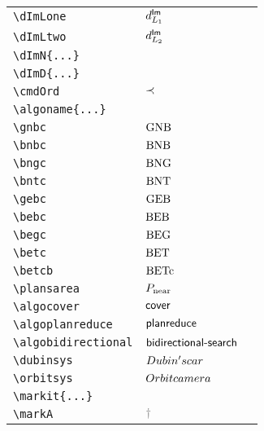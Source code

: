 \begin{longtable}{lll}
 {\color[rgb]{0.5,0.5,0.5}\texttt{\textbackslash dImLone}} & $d^{\mathsf{Im}}_{L_{1}}$ & \\ 
 {\color[rgb]{0.5,0.5,0.5}\texttt{\textbackslash dImLtwo}} & $d^{\mathsf{Im}}_{L_{2}}$ & \\ 
 {\color[rgb]{0.5,0.5,0.5}\texttt{\textbackslash dImN\{...\}}} &  & \\ 
 {\color[rgb]{0.5,0.5,0.5}\texttt{\textbackslash dImD\{...\}}} &  & \\ 
 {\color[rgb]{0.5,0.5,0.5}\texttt{\textbackslash cmdOrd}} & $\prec$ & \\ 
 {\color[rgb]{0.5,0.5,0.5}\texttt{\textbackslash algoname\{...\}}} &  & \\ 
 {\color[rgb]{0.5,0.5,0.5}\texttt{\textbackslash gnbc}} & $\text{GNB}$ & \\ 
 {\color[rgb]{0.5,0.5,0.5}\texttt{\textbackslash bnbc}} & $\text{BNB}$ & \\ 
 {\color[rgb]{0.5,0.5,0.5}\texttt{\textbackslash bngc}} & $\text{BNG}$ & \\ 
 {\color[rgb]{0.5,0.5,0.5}\texttt{\textbackslash bntc}} & $\text{BNT}$ & \\ 
 {\color[rgb]{0.5,0.5,0.5}\texttt{\textbackslash gebc}} & $\text{GEB}$ & \\ 
 {\color[rgb]{0.5,0.5,0.5}\texttt{\textbackslash bebc}} & $\text{BEB}$ & \\ 
 {\color[rgb]{0.5,0.5,0.5}\texttt{\textbackslash begc}} & $\text{BEG}$ & \\ 
 {\color[rgb]{0.5,0.5,0.5}\texttt{\textbackslash betc}} & $\text{BET}$ & \\ 
 {\color[rgb]{0.5,0.5,0.5}\texttt{\textbackslash betcb}} & $\text{BETc}$ & \\ 
 {\color[rgb]{0.5,0.5,0.5}\texttt{\textbackslash plansarea}} & $P_{\text{near}}$ & \\ 
 {\color[rgb]{0.5,0.5,0.5}\texttt{\textbackslash algocover}} & $\textsf{cover}$ & \\ 
 {\color[rgb]{0.5,0.5,0.5}\texttt{\textbackslash algoplanreduce}} & $\textsf{planreduce}$ & \\ 
 {\color[rgb]{0.5,0.5,0.5}\texttt{\textbackslash algobidirectional}} & $\textsf{bidirectional-search}$ & \\ 
 {\color[rgb]{0.5,0.5,0.5}\texttt{\textbackslash dubinsys}} & $Dubin's car$ & \\ 
 {\color[rgb]{0.5,0.5,0.5}\texttt{\textbackslash orbitsys}} & $Orbit camera$ & \\ 
 {\color[rgb]{0.5,0.5,0.5}\texttt{\textbackslash markit\{...\}}} &  & \\ 
 {\color[rgb]{0.5,0.5,0.5}\texttt{\textbackslash markA}} & $\markA$ & \\ 

\end{longtable}
